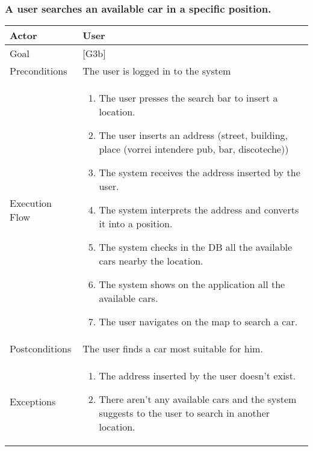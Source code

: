 \documentclass{article}
\begin{document}
	\subsubsection{A user searches an available car in a specific position.}
	\begin{tabularx}{\textwidth}{  l  X  }
		\hline
		Actor & User\\
		\hline
		Goal & [G3b]\\
		\hline
		Preconditions & The user is logged in to the system\\
		\hline
		Execution Flow & \begin{enumerate}
			\item{The user presses the search bar to insert a location.}
										 \item{The user inserts an address (street, building, place (vorrei intendere pub, bar, discoteche))}
										 \item{The system receives the address inserted by the user.}
                     \item{The system interprets the address and converts it into a position.}
                     \item{The system checks in the DB all the available cars nearby the location.}
										 \item{The system shows on the application all the available cars.}
										 \item{The user navigates on the map to search a car.}
										\end{enumerate}\\
		\hline
		Postconditions & The user finds a car most suitable for him.\\
		\hline
		Exceptions & \begin{enumerate}
				\item{The address inserted by the user doesn't exist.}
								 \item{There aren't any available cars and the system suggests to the user to search in another location.}
					\end{enumerate}\\
		\hline
	\end{tabularx}
\end{document}
